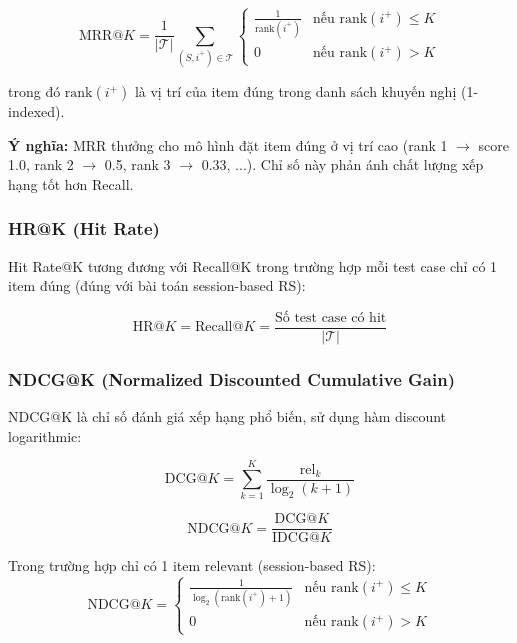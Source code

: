 \documentclass[12pt, a4paper]{article}
\begin{document}
\begin{equation}
\boxed{
    \text{MRR@}K = \frac{1}{|\mathcal{T}|} \sum_{(S, i^+) \in \mathcal{T}} \begin{cases} \frac{1}{\text{rank}(i^+)} & \text{nếu } \text{rank}(i^+) \leq K \\ 0 & \text{nếu } \text{rank}(i^+) > K \end{cases}
}
\label{eq:mrr}
\end{equation}

trong đó $\text{rank}(i^+)$ là vị trí của item đúng trong danh sách khuyến nghị (1-indexed).

\textbf{Ý nghĩa:} MRR thưởng cho mô hình đặt item đúng ở vị trí cao (rank 1 $\rightarrow$ score 1.0, rank 2 $\rightarrow$ 0.5, rank 3 $\rightarrow$ 0.33, ...). Chỉ số này phản ánh chất lượng xếp hạng tốt hơn Recall.

\subsubsection{HR@K (Hit Rate)}

Hit Rate@K tương đương với Recall@K trong trường hợp mỗi test case chỉ có 1 item đúng (đúng với bài toán session-based RS):

\begin{equation}
    \text{HR@}K = \text{Recall@}K = \frac{\text{Số test case có hit}}{|\mathcal{T}|}
    \label{eq:hr}
\end{equation}

\subsubsection{NDCG@K (Normalized Discounted Cumulative Gain)}

NDCG@K là chỉ số đánh giá xếp hạng phổ biến, sử dụng hàm discount logarithmic:

\begin{equation}
    \text{DCG@}K = \sum_{k=1}^{K} \frac{\text{rel}_k}{\log_2(k+1)}
    \label{eq:dcg}
\end{equation}

\begin{equation}
    \text{NDCG@}K = \frac{\text{DCG@}K}{\text{IDCG@}K}
    \label{eq:ndcg}
\end{equation}

Trong trường hợp chỉ có 1 item relevant (session-based RS):
\begin{equation}
    \text{NDCG@}K = \begin{cases} \frac{1}{\log_2(\text{rank}(i^+) + 1)} & \text{nếu } \text{rank}(i^+) \leq K \\ 0 & \text{nếu } \text{rank}(i^+) > K \end{cases}
    \label{eq:ndcg_single}
\end{equation}
\end{document}
